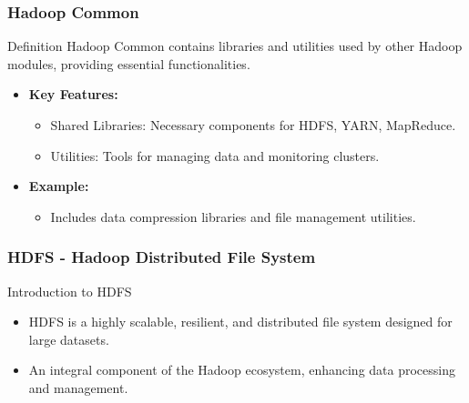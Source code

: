 \documentclass[aspectratio=169]{beamer}
\begin{document}
\begin{frame}[fragile]
    \frametitle{Hadoop Common}
    \begin{block}{Definition}
        Hadoop Common contains libraries and utilities used by other Hadoop modules, providing essential functionalities.
    \end{block}
    \begin{itemize}
        \item \textbf{Key Features:}
        \begin{itemize}
            \item Shared Libraries: Necessary components for HDFS, YARN, MapReduce.
            \item Utilities: Tools for managing data and monitoring clusters.
        \end{itemize}
        \item \textbf{Example:} 
        \begin{itemize}
            \item Includes data compression libraries and file management utilities.
        \end{itemize}
    \end{itemize}
\end{frame}

\begin{frame}[fragile]
    \frametitle{HDFS - Hadoop Distributed File System}
    \begin{block}{Introduction to HDFS}
        \begin{itemize}
            \item HDFS is a highly scalable, resilient, and distributed file system designed for large datasets.
            \item An integral component of the Hadoop ecosystem, enhancing data processing and management.
        \end{itemize}
    \end{block}
\end{frame}
\end{document}
